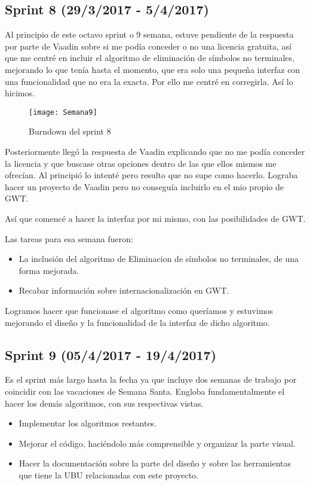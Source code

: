 \subsection{Sprint 8 (29/3/2017 - 5/4/2017)}

Al principio de este octavo sprint o 9 semana, estuve pendiente de la respuesta por parte de Vaadin sobre si me podía conceder o no una licencia gratuita, así que me centré en incluir el algoritmo de eliminación de símbolos no terminales, mejorando lo que tenía hasta el momento, que era solo una pequeña interfaz con una funcionalidad que no era la exacta. Por ello me centré en corregirla. Así lo hicimos.

\begin{figure}[h]
\centering
\texttt{[image: Semana9]}
\caption{Burndown del sprint 8}
\label{fig:A.2.6}
\end{figure}

Posteriormente llegó la respuesta de Vaadin explicando que no me podía conceder la licencia y que buscase otras opciones dentro de las que ellos mismos me ofrecían. Al principió lo intenté pero resulto que no supe como hacerlo. Lograba hacer un proyecto de Vaadin pero no conseguía incluirlo en el mio propio de GWT.

Así que comencé a hacer la interfaz por mi mismo, con las posibilidades de GWT.

Las tareas para esa semana fueron: 

\begin{itemize}
\item La inclusión del algoritmo de Eliminacion de símbolos no terminales, de una forma mejorada.
\item Recabar información sobre internacionalización en GWT.
\end{itemize}

Logramos hacer que funcionase el algoritmo como queríamos y estuvimos mejorando el diseño y la funcionalidad de la interfaz de dicho algoritmo.

\subsection{Sprint 9 (05/4/2017 - 19/4/2017)}

Es el sprint más largo hasta la fecha ya que incluye dos semanas de trabajo por coincidir con las vacaciones de Semana Santa. Engloba fundamentalmente el hacer los demás algoritmos, con sus respectivas vistas.

\begin{itemize}
\item Implementar los algoritmos restantes.
\item Mejorar el código, haciéndolo más comprensible y organizar la parte visual.
\item Hacer la documentación sobre la parte del diseño y sobre las herramientas que tiene la UBU relacionadas con este proyecto.
\end{itemize}

